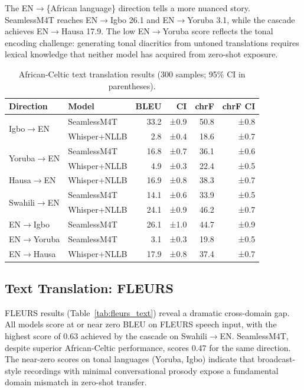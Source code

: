\documentclass[11pt,a4paper]{article}
\newcommand{\dataAC}{African-Celtic}
\newcommand{\dataFL}{FLEURS}
\begin{document}
The EN$\to$\{African language\} direction tells a more nuanced story. SeamlessM4T reaches EN$\to$Igbo 26.1 and EN$\to$Yoruba 3.1, while the cascade achieves EN$\to$Hausa 17.9. The low EN$\to$Yoruba score reflects the tonal encoding challenge: generating tonal diacritics from untoned translations requires lexical knowledge that neither model has acquired from zero-shot exposure.

\begin{table}[t]
\centering
\small
\setlength{\tabcolsep}{4pt}
\caption{\dataAC{} text translation results (300 samples; 95\% CI in parentheses).}
\label{tab:ac_text}
\begin{tabular}{llrrrr}
\toprule
\textbf{Direction} & \textbf{Model} & \textbf{BLEU} & \textbf{CI} & \textbf{chrF} & \textbf{chrF CI} \\
\midrule
\multirow{2}{*}{Igbo$\to$EN}
  & SeamlessM4T & 33.2 & ±0.9 & 50.8 & ±0.8 \\
  & Whisper+NLLB & 2.8  & ±0.4 & 18.6 & ±0.7 \\
\midrule
\multirow{2}{*}{Yoruba$\to$EN}
  & SeamlessM4T & 16.8 & ±0.7 & 36.1 & ±0.6 \\
  & Whisper+NLLB & 4.9  & ±0.3 & 22.4 & ±0.5 \\
\midrule
Hausa$\to$EN & Whisper+NLLB & 16.9 & ±0.8 & 38.3 & ±0.7 \\
\midrule
\multirow{2}{*}{Swahili$\to$EN}
  & SeamlessM4T & 14.1 & ±0.6 & 33.9 & ±0.5 \\
  & Whisper+NLLB & 24.1 & ±0.9 & 46.2 & ±0.7 \\
\midrule
EN$\to$Igbo   & SeamlessM4T & 26.1 & ±1.0 & 44.7 & ±0.9 \\
EN$\to$Yoruba & SeamlessM4T & 3.1  & ±0.3 & 19.8 & ±0.5 \\
EN$\to$Hausa  & Whisper+NLLB & 17.9 & ±0.8 & 37.4 & ±0.7 \\
\bottomrule
\end{tabular}
\end{table}

\subsection{Text Translation: \dataFL{}}

FLEURS results (Table~\ref{tab:fleurs_text}) reveal a dramatic cross-domain gap. All models score at or near zero BLEU on FLEURS speech input, with the highest score of 0.63 achieved by the cascade on Swahili$\to$EN. SeamlessM4T, despite superior \dataAC{} performance, scores 0.47 for the same direction. The near-zero scores on tonal languages (Yoruba, Igbo) indicate that broadcast-style recordings with minimal conversational prosody expose a fundamental domain mismatch in zero-shot transfer.
\end{document}
